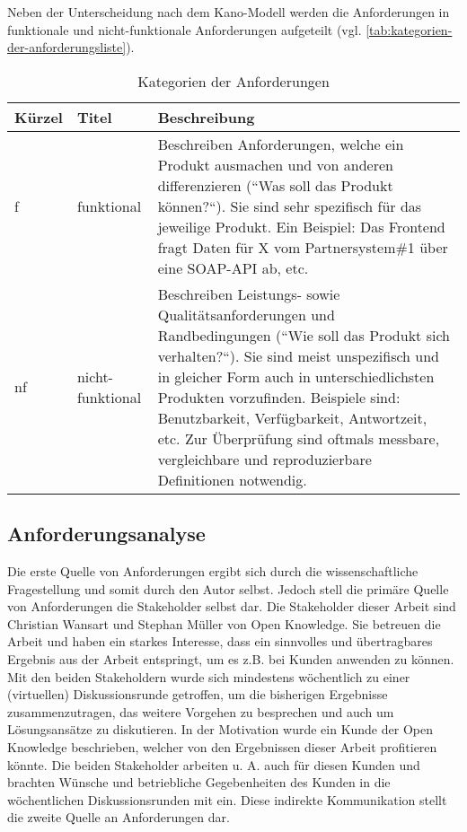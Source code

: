 Neben der Unterscheidung nach dem Kano-Modell werden die Anforderungen in funktionale und nicht-funktionale Anforderungen \cite{FunktionaleUndNichtFunktionaleAnforderungen} aufgeteilt (vgl. \autoref{tab:kategorien-der-anforderungsliste}).

\begin{table}[H]
\begin{tabular}{ |p{1.15cm}|p{2.75cm}|p{9.6cm}| }
	\hline
	Kürzel & Titel & Beschreibung \\
	\hline
	f & funktional & Beschreiben Anforderungen, welche ein Produkt ausmachen und von anderen differenzieren (``Was soll das Produkt können?{``}). Sie sind sehr spezifisch für das jeweilige Produkt. Ein Beispiel: Das Frontend fragt Daten für X vom Partnersystem\#1 über eine SOAP-API ab, etc.\\
	\hline
	nf & nicht-funktional & Beschreiben Leistungs- sowie Qualitätsanforderungen und Randbedingungen (``Wie soll das Produkt sich verhalten?{``}). Sie sind meist unspezifisch und in gleicher Form auch in unterschiedlichsten Produkten vorzufinden. Beispiele sind: Benutzbarkeit, Verfügbarkeit, Antwortzeit, etc. Zur Überprüfung sind oftmals messbare, vergleichbare und reproduzierbare Definitionen notwendig. \\
	\hline
\end{tabular}
 \captionsetup{justification=centering}
  \caption{Kategorien der Anforderungen}
   \label{tab:kategorien-der-anforderungsliste}
\end{table}
	
\subsection{Anforderungsanalyse}

Die erste Quelle von Anforderungen ergibt sich durch die wissenschaftliche Fragestellung und somit durch den Autor selbst. Jedoch stell die primäre Quelle von Anforderungen die Stakeholder selbst dar. Die Stakeholder dieser Arbeit sind Christian Wansart und Stephan Müller von Open Knowledge. Sie betreuen die Arbeit und haben ein starkes Interesse, dass ein sinnvolles und übertragbares Ergebnis aus der Arbeit entspringt, um es z.B. bei Kunden anwenden zu können. Mit den beiden Stakeholdern wurde sich mindestens wöchentlich zu einer (virtuellen) Diskussionsrunde getroffen, um die bisherigen Ergebnisse zusammenzutragen, das weitere Vorgehen zu besprechen und auch um Lösungsansätze zu diskutieren. In der Motivation wurde ein Kunde der Open Knowledge beschrieben, welcher von den Ergebnissen dieser Arbeit profitieren könnte. Die beiden Stakeholder arbeiten u. A. auch für diesen Kunden und brachten Wünsche und betriebliche Gegebenheiten des Kunden in die wöchentlichen Diskussionsrunden mit ein. Diese indirekte Kommunikation stellt die zweite Quelle an Anforderungen dar.

